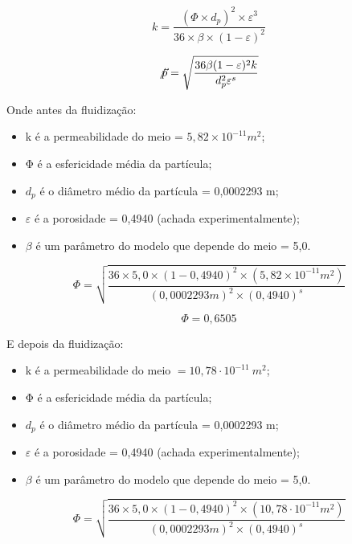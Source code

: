 \begin{equation}\label{key}
k=\frac{\left(\Phi \times d_{p}\right)^{2} \times \varepsilon^{3}}{36 \times \beta \times(1-\varepsilon)^{2}}
\end{equation}

\begin{equation}\label{key}
\not \vec{p}=\sqrt{\frac{36 \beta(1-\varepsilon)^{2} k}{d_{p}^{2} \varepsilon^{s}}}
\end{equation}

Onde antes da fluidização:


\begin{itemize}
\item k é a permeabilidade do meio = $ 5,82 \times 10^{-11} m^{2} $;
\item $ \mathrm{\Phi} $ é a esfericidade média da partícula;
\item $ d_p $ é o diâmetro médio da partícula = 0,0002293 m;
\item $ \varepsilon $ é a porosidade = 0,4940 (achada experimentalmente);
\item $ \beta $ é um parâmetro do modelo que depende do meio = 5,0.
\end{itemize}


\begin{equation}\label{key}
\Phi=\sqrt{\frac{36 \times 5,0 \times(1-0,4940)^{2} \times\left(5,82 \times 10^{-11} m^{2}\right)}{(0,0002293 m)^{2} \times(0,4940)^{s}}}
\end{equation}

\begin{equation}\label{key}
\Phi=0,6505
\end{equation}

E depois da fluidização:

\begin{itemize}
\item k é a permeabilidade do meio $ = 10,78 \cdot 10^{-11} \ m^{2} $;
\item $ \mathrm{\Phi} $ é a esfericidade média da partícula;
\item $ d_p $ é o diâmetro médio da partícula = 0,0002293 m;
\item $ \varepsilon $ é a porosidade = 0,4940 (achada experimentalmente);
\item $ \beta $ é um parâmetro do modelo que depende do meio = 5,0.
\end{itemize}

\begin{equation}\label{key}
\Phi=\sqrt{\frac{36 \times 5,0 \times(1-0,4940)^{2} \times\left(10,78 \cdot 10^{-11} m^{2}\right)}{(0,0002293 m)^{2} \times(0,4940)^{s}}}
\end{equation}

